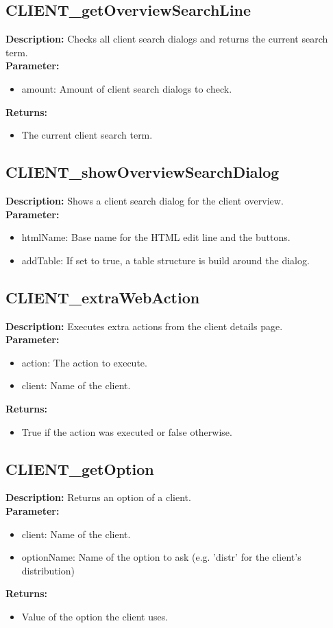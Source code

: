 \subsection{CLIENT\_getOverviewSearchLine}
\textbf{Description:} Checks all client search dialogs and returns the current search term.\\
\textbf{Parameter:}
\begin{itemize}
\item amount: Amount of client search dialogs to check.
\end{itemize}
\textbf{Returns:}
\begin{itemize}
\item The current client search term.
\end{itemize}

\subsection{CLIENT\_showOverviewSearchDialog}
\textbf{Description:} Shows a client search dialog for the client overview.\\
\textbf{Parameter:}
\begin{itemize}
\item htmlName: Base name for the HTML edit line and the buttons.
\item addTable: If set to true, a table structure is build around the dialog.
\end{itemize}

\subsection{CLIENT\_extraWebAction}
\textbf{Description:} Executes extra actions from the client details page.\\
\textbf{Parameter:}
\begin{itemize}
\item action: The action to execute.
\item client: Name of the client.
\end{itemize}
\textbf{Returns:}
\begin{itemize}
\item True if the action was executed or false otherwise.
\end{itemize}

\subsection{CLIENT\_getOption}
\textbf{Description:} Returns an option of a client.\\
\textbf{Parameter:}
\begin{itemize}
\item client: Name of the client.
\item optionName: Name of the option to ask (e.g. 'distr' for the client's distribution)
\end{itemize}
\textbf{Returns:}
\begin{itemize}
\item Value of the option the client uses.
\end{itemize}

